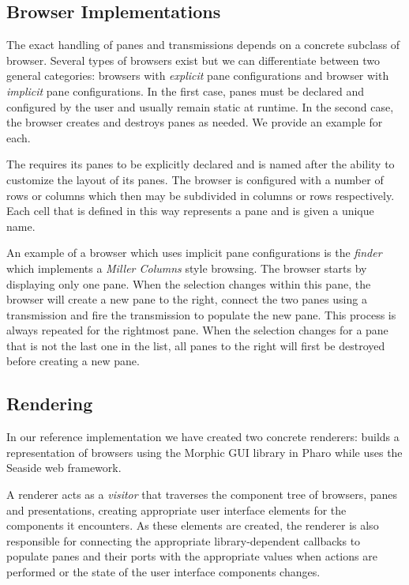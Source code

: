 \documentclass[a4paper,10pt,twoside]{book}
\begin{document}
\subsection{Browser Implementations}
\label{sec:impl/browser-implementations}

The exact handling of panes and transmissions depends on a concrete subclass of browser. Several types of browsers exist but we can differentiate between two general categories: browsers with \emph{explicit} pane configurations and browser with \emph{implicit} pane configurations. In the first case, panes must be declared and configured by the user and usually remain static at runtime. In the second case, the browser creates and destroys panes as needed. We provide an example for each.

The  requires its panes to be explicitly declared and is named after the ability to customize the layout of its panes. The browser is configured with a number of rows or columns which then may be subdivided in columns or rows respectively. Each cell that is defined in this way represents a pane and is given a unique name.

An example of a browser which uses implicit pane configurations is the \emph{finder} which implements a \emph{Miller Columns} style browsing. The browser starts by displaying only one pane. When the selection changes within this pane, the browser will create a new pane to the right, connect the two panes using a transmission and fire the transmission to populate the new pane. This process is always repeated for the rightmost pane. When the selection changes for a pane that is not the last one in the list, all panes to the right will first be destroyed before creating a new pane.



\subsection{Rendering}
\label{sec:impl/rendering}

In our reference implementation we have created two concrete
renderers:  builds a representation of browsers
using the Morphic GUI library in Pharo while 
uses the Seaside web framework.

A renderer acts as a \emph{visitor} that traverses the
component tree of browsers, panes and presentations, creating
appropriate user interface elements for the components it
encounters. As these elements are created, the renderer is also
responsible for connecting the appropriate library-dependent callbacks
to populate panes and their ports with the appropriate values when
actions are performed or the state of the user interface components
changes.
\end{document}
